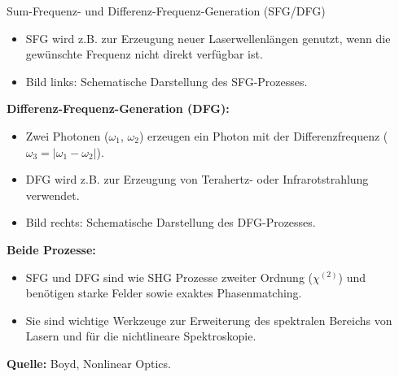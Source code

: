 \documentclass[aspectratio=169]{beamer} %
\begin{document}
\begin{frame}[noframenumbering]{Sum-Frequenz- und Differenz-Frequenz-Generation (SFG/DFG)}
{\begin{itemize}
      \item SFG wird z.B. zur Erzeugung neuer Laserwellenlängen genutzt, wenn die gewünschte Frequenz nicht direkt verfügbar ist.
      \item Bild links: Schematische Darstellung des SFG-Prozesses.
    \end{itemize}
    \textbf{Differenz-Frequenz-Generation (DFG):}
    \begin{itemize}
      \item Zwei Photonen ($\omega_1$, $\omega_2$) erzeugen ein Photon mit der Differenzfrequenz ($\omega_3 = |\omega_1 - \omega_2|$).
      \item DFG wird z.B. zur Erzeugung von Terahertz- oder Infrarotstrahlung verwendet.
      \item Bild rechts: Schematische Darstellung des DFG-Prozesses.
    \end{itemize}
    \textbf{Beide Prozesse:}
    \begin{itemize}
      \item SFG und DFG sind wie SHG Prozesse zweiter Ordnung ($\chi^{(2)}$) und benötigen starke Felder sowie exaktes Phasenmatching.
      \item Sie sind wichtige Werkzeuge zur Erweiterung des spektralen Bereichs von Lasern und für die nichtlineare Spektroskopie.
    \end{itemize}
    \textbf{Quelle:} Boyd, Nonlinear Optics.
  }
\end{frame}
\end{document}
